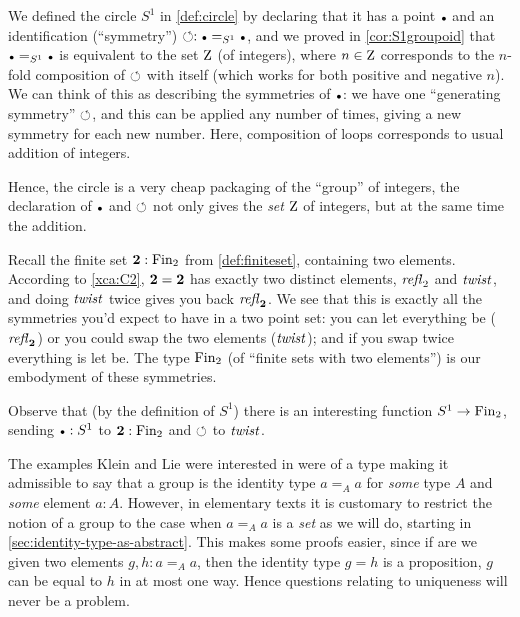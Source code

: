 \begin{example}\label{ex:base=base}
  We defined the circle $S^1$ in \cref{def:circle} by declaring that it has a point $\base$ and an identification (``symmetry'') $\Sloop:\base=_{S^1}\base$, and we proved in \cref{cor:S1groupoid} that $\base=_{S^1}\base$ is equivalent to the set $\mathrm{Z}$ (of integers), where $n\in\mathrm{Z}$ corresponds to the $n$-fold composition of $\circlearrowleft$ with itself (which works for both positive and negative $n$).  
We can think of this as describing the symmetries of $\base$: we have one ``generating symmetry'' $\circlearrowleft$, and this can be applied any number of times, giving a new symmetry for each new number.  
Here, composition of loops corresponds to usual addition of integers.  

Hence, the circle is a very cheap packaging of the ``{group}'' of integers, the declaration of $\base$ and $\circlearrowleft$ not only gives the \emph{set} $\mathrm{Z}$ of integers, but at the same time the addition.
\end{example}
\begin{example}
  Recall the finite set $\mathbf{2}:\operatorname{Fin}_2$ from \cref{def:finiteset}, containing two elements.   
According to \cref{xca:C2}, $\mathbf{2} =\mathbf{2} $ has exactly two distinct elements, $\mathop{\mathit{refl}_{\mathrm 2}}$ and $\mathit{twist}$, and doing $\mathit{twist}$ twice gives you back $\mathop{\mathit{refl}_{\mathbf{2} }}$.  
We see that this is exactly all the symmetries you'd expect to have in a two point set: you can let everything be ($\mathop{\mathit{refl}_{\mathbf{2} }}$) or you could swap the two elements ($\mathit{twist}$); and if you swap twice everything is let be.  
The type $\operatorname{Fin}_2$ (of ``finite sets with two elements'') is our embodyment of these symmetries.  

Observe that (by the definition of $S^1$) there is an interesting function $S^1\to\operatorname{Fin}_2$, sending $\base:S^1$ to $\mathbf{2} :\operatorname{Fin}_2$ and $\circlearrowleft$ to $\mathit{twist}$.
\end{example}


The examples Klein and Lie were interested in were of a type making it admissible to say that a group is the identity type $a=_Aa$ for \emph{some} type $A$ and \emph{some} element $a:A$.
However, in elementary texts it is customary to restrict the notion of a group to the case when $a=_Aa$ is a \emph{set} as we will do, starting in \cref{sec:identity-type-as-abstract}.  This makes some proofs easier, since if are we given two elements $g,h:a=_Aa$, then the identity type $g=h$ is a proposition, \ie $g$ can be equal to $h$ in at most one way.  Hence questions relating to uniqueness will never be a problem.



